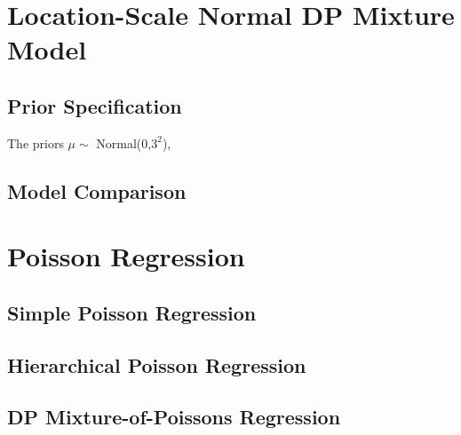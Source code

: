 \documentclass{article}
\begin{document}
\section{Location-Scale Normal DP Mixture Model}
\subsection{Prior Specification}
The priors $\mu \sim$ Normal(0,$3^2$), 

\subsection{Model Comparison}


\section{Poisson Regression}
\subsection{Simple Poisson Regression}
\subsection{Hierarchical Poisson Regression}
\subsection{DP Mixture-of-Poissons Regression}
\end{document}
